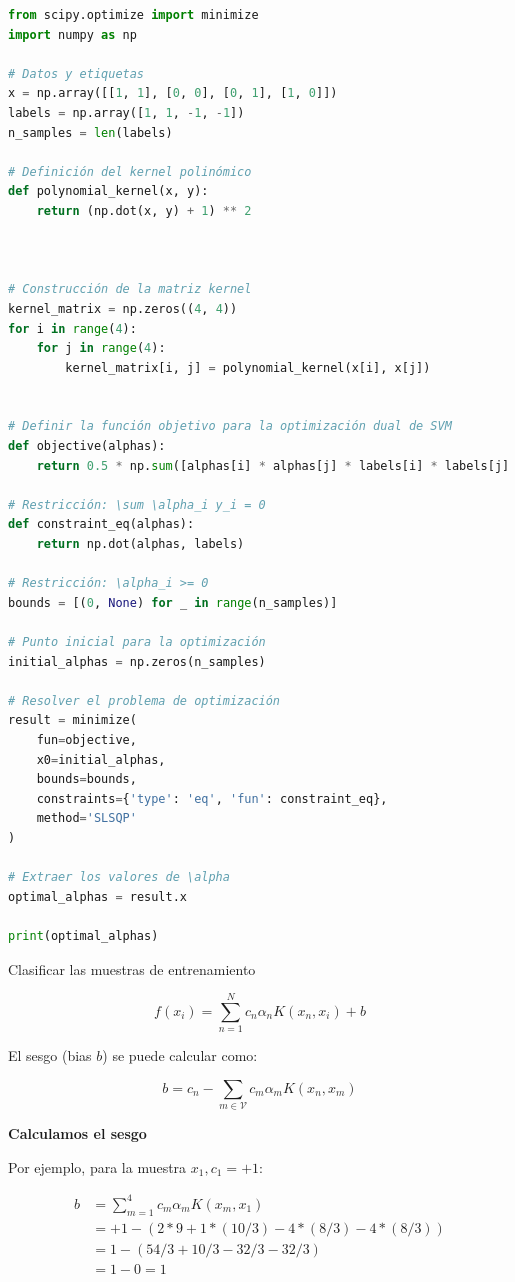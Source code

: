 \begin{lstlisting}[language=Python]
from scipy.optimize import minimize
import numpy as np

# Datos y etiquetas
x = np.array([[1, 1], [0, 0], [0, 1], [1, 0]])
labels = np.array([1, 1, -1, -1])
n_samples = len(labels)

# Definición del kernel polinómico
def polynomial_kernel(x, y):
    return (np.dot(x, y) + 1) ** 2



# Construcción de la matriz kernel
kernel_matrix = np.zeros((4, 4))
for i in range(4):
    for j in range(4):
        kernel_matrix[i, j] = polynomial_kernel(x[i], x[j])


# Definir la función objetivo para la optimización dual de SVM
def objective(alphas):
    return 0.5 * np.sum([alphas[i] * alphas[j] * labels[i] * labels[j] * kernel_matrix[i, j] for i in range(n_samples) for j in range(n_samples)]) - np.sum(alphas)

# Restricción: \sum \alpha_i y_i = 0
def constraint_eq(alphas):
    return np.dot(alphas, labels)

# Restricción: \alpha_i >= 0
bounds = [(0, None) for _ in range(n_samples)]

# Punto inicial para la optimización
initial_alphas = np.zeros(n_samples)

# Resolver el problema de optimización
result = minimize(
    fun=objective,
    x0=initial_alphas,
    bounds=bounds,
    constraints={'type': 'eq', 'fun': constraint_eq},
    method='SLSQP'
)

# Extraer los valores de \alpha
optimal_alphas = result.x

print(optimal_alphas)
\end{lstlisting}

Clasificar las muestras de entrenamiento

\begin{equation*}
    f(x_i) = \sum_{n=1}^{N} c_n \alpha_n K(x_n, x_i) + b
\end{equation*}

El sesgo (bias $b$) se puede calcular como:

\begin{equation*}
    b = c_n - \sum_{m\in \mathcal{V}} c_m \alpha_m K(x_n, x_m)
\end{equation*}

\textbf{Calculamos el sesgo}

Por ejemplo, para la muestra $x_1, c_1 = +1$:

\begin{align*}
    b & = \sum_{m = 1}^{4} c_m \alpha_m K(x_m, x_1) \\
    & = +1-(2*9 + 1*(10/3) - 4*(8/3) - 4*(8/3)) \\
    & = 1- (54/3 + 10/3 - 32/3 -32/3) \\
    & = 1-0=1
\end{align*}